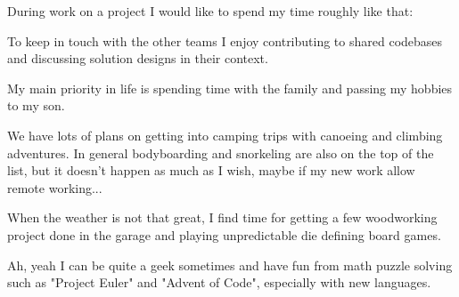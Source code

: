 \documentclass[10pt,a4paper,ragged2e,withhyper]{altacv}
\begin{document}
During work on a project I would like to spend my time roughly like that:


\vspace{5px}

To keep in touch with the other teams I enjoy contributing to shared codebases and
discussing solution designs in their context.


My main priority in life is spending time with the family and passing my hobbies to my son.

We have lots of plans on getting into camping trips with canoeing and climbing adventures.
In general bodyboarding and snorkeling are also on the top of the list, but it doesn't
happen as much as I wish, maybe if my new work allow remote working...

When the weather is not that great, I find time for getting a few woodworking project done
in the garage and playing unpredictable die defining board games.

Ah, yeah I can be quite a geek sometimes and have fun from math puzzle solving such as
"Project Euler" and "Advent of Code", especially with new languages.

\end{document}
